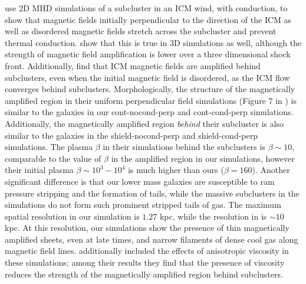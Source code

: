 \documentclass[twocolumn]{aastex6}
\begin{document}
\citet{Asai04} use 2D MHD simulations of a subcluster in an ICM wind, with conduction, to show that magnetic fields initially perpendicular to the direction of the ICM as well as disordered magnetic fields stretch across the subcluster and prevent thermal conduction. \citet{Asai05} show that this is true in 3D simulations as well, although the strength of magnetic field amplification is lower over a three dimensional shock front. Additionally, \citet{Asai07} find that ICM magnetic fields are amplified behind subclusters, even when the initial magnetic field is disordered, as the ICM flow converges behind subclusters. Morphologically, the structure of the magnetically amplified region in their uniform perpendicular field simulations (Figure 7 in \citealt{Asai07}) is similar to the galaxies in our cont-nocond-perp and cont-cond-perp simulations. Additionally, the  magnetically amplified region \emph{behind} their subcluster is also similar to the galaxies in the shield-nocond-perp and shield-cond-perp simulations. The plasma $\beta$ in their simulations behind the subclusters is $\beta \sim 10$, comparable to the value of $\beta$ in the amplified region in our simulations, however their initial plasma $\beta \sim 10^3 - 10^4$ is much higher than ours ($\beta = 160$). Another significant difference is that our lower mass galaxies are susceptible to ram pressure stripping and the formation of tails, while the massive subclusters in the \citet{Asai07} simulations do not form such prominent stripped tails of gas. The maximum spatial resolution  in our simulation is $1.27$ kpc, while the resolution in  \citet{Asai07} is $\sim 10$ kpc. At this resolution, our simulations show the presence of thin magnetically amplified sheets, even at late times, and narrow filaments of dense cool gas along magnetic field lines. \citet{Suzuki13} additionally included the effects of anisotropic viscosity in these simulations; among their results they find that the presence of viscosity reduces the strength of the magnetically amplified region behind subclusters. 
\end{document}
